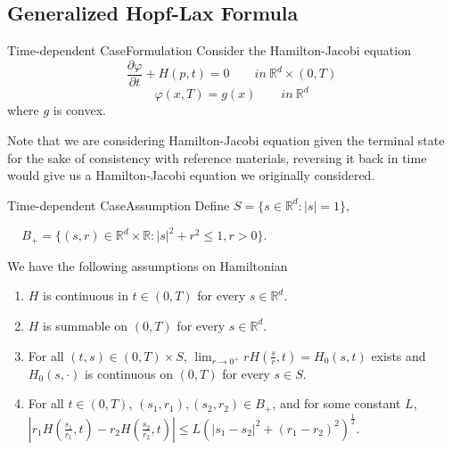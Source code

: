 \documentclass[english]{pkuslide}
\begin{document}
\subsection{Generalized Hopf-Lax Formula}
\begin{frame}{Time-dependent Case}{Formulation}
Consider the Hamilton-Jacobi equation
\begin{equation}
\frac{\partial \varphi}{\partial t} + H(p,t) = 0  \qquad in\  \mathbb{R}^{d} \times (0,T) 
\end{equation}
\begin{equation}
\varphi(x,T) = g(x)  \qquad in\  \mathbb{R}^{d}
\end{equation}
where $g$ is convex.

Note that we are considering Hamilton-Jacobi equation given the terminal state for the sake of consistency with reference materials, reversing it back in time would give us a Hamilton-Jacobi equation we originally considered.
\end{frame}
\begin{frame}{Time-dependent Case}{Assumption}
Define \begin{math} S=\{ s \in \mathbb{R}^{d} : |s|=1\}    \end{math}, 

\qquad\ \ \,\begin{math}B_{+}=\{(s,r) \in \mathbb{R}^{d} \times \mathbb{R} : |s|^2+r^2\leq 1, r>0\}\end{math}.

We have the following assumptions on Hamiltonian
\begin{enumerate}[<+->]
\item $H$ is continuous in $t \in (0,T)$ for every \begin{math}s \in \mathbb{R}^{d}\end{math}.
\item $H$ is summable on $(0,T)$ for every \begin{math}s \in \mathbb{R}^{d}\end{math}.
\item For all $(t,s) \in (0,T)\times S$, $\lim_{r \to 0^{+}}rH(\frac{s}{r},t)=H_{0}(s,t)$ exists and $H_{0}(s,\cdot)$ is continuous on $(0,T)$ for every $s \in S$.
\item For all $t \in (0,T)$, $(s_1,r_1), (s_2,r_2) \in B_{+}$, and for some constant $L$, $|r_{1}H(\frac{s_{1}}{r_{1}},t)-r_{2}H(\frac{s_{2}}{r_{2}},t)| \leq L(|s_{1}-s_{2}|^2+(r_{1}-r_{2})^2)^{\frac{1}{2}}$.
\end{enumerate}
\end{frame}
\end{document}
